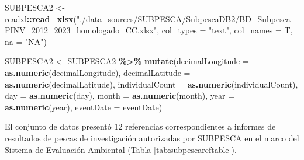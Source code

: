 \documentclass[sn-apa,pdflatex]{sn-jnl}
\newenvironment{Shaded}{\begin{snugshade}}{\end{snugshade}}
\newcommand{\AttributeTok}[1]{\textcolor[rgb]{0.13,0.29,0.53}{#1}}
\newcommand{\FunctionTok}[1]{\textcolor[rgb]{0.13,0.29,0.53}{\textbf{#1}}}
\newcommand{\NormalTok}[1]{#1}
\newcommand{\OtherTok}[1]{\textcolor[rgb]{0.56,0.35,0.01}{#1}}
\newcommand{\SpecialCharTok}[1]{\textcolor[rgb]{0.81,0.36,0.00}{\textbf{#1}}}
\newcommand{\StringTok}[1]{\textcolor[rgb]{0.31,0.60,0.02}{#1}}
\begin{document}
\begin{Shaded}
\begin{Highlighting}[]
\NormalTok{SUBPESCA2 }\OtherTok{\textless{}{-}}\NormalTok{ readxl}\SpecialCharTok{::}\FunctionTok{read\_xlsx}\NormalTok{(}\StringTok{"./data\_sources/SUBPESCA/SubpescaDB2/BD\_Subpesca\_PINV\_2012\_2023\_homologado\_CC.xlsx"}\NormalTok{,}
    \AttributeTok{col\_types =} \StringTok{"text"}\NormalTok{, }\AttributeTok{col\_names =}\NormalTok{ T, }\AttributeTok{na =} \StringTok{"NA"}\NormalTok{)}

\NormalTok{SUBPESCA2 }\OtherTok{\textless{}{-}}\NormalTok{ SUBPESCA2 }\SpecialCharTok{\%\textgreater{}\%}
    \FunctionTok{mutate}\NormalTok{(}\AttributeTok{decimalLongitude =} \FunctionTok{as.numeric}\NormalTok{(decimalLongitude), }\AttributeTok{decimalLatitude =} \FunctionTok{as.numeric}\NormalTok{(decimalLatitude),}
        \AttributeTok{individualCount =} \FunctionTok{as.numeric}\NormalTok{(individualCount), }\AttributeTok{day =} \FunctionTok{as.numeric}\NormalTok{(day),}
        \AttributeTok{month =} \FunctionTok{as.numeric}\NormalTok{(month), }\AttributeTok{year =} \FunctionTok{as.numeric}\NormalTok{(year), }\AttributeTok{eventDate =}\NormalTok{ eventDate)}
\end{Highlighting}
\end{Shaded}

El conjunto de datos presentó 12 referencias correspondientes a informes
de resultados de pescas de investigación autorizadas por SUBPESCA en el
marco del Sistema de Evaluación Ambiental (Tabla
\ref{tab:subpescareftable}).

\begingroup\fontsize{8}{10}\selectfont
\end{document}

